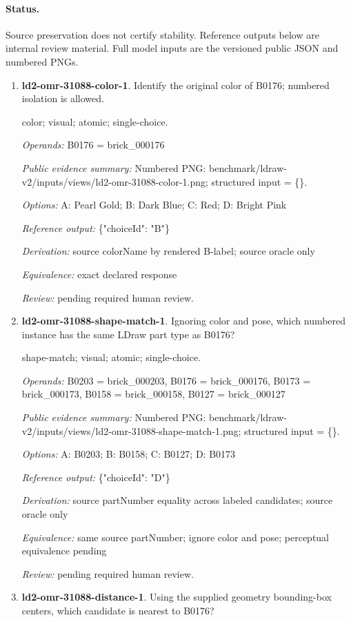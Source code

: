 \paragraph{Status.}Source preservation does not certify stability. Reference outputs below are internal review material. Full model inputs are the versioned public JSON and numbered PNGs.
\begin{enumerate}
\item \textbf{ld2-omr-31088-color-1}. Identify the original color of B0176; numbered isolation is allowed.
\par{\small color; visual; atomic; single-choice.\par\textit{Operands:} B0176 = brick\_000176\par\textit{Public evidence summary:} Numbered PNG: benchmark/ldraw-v2/inputs/views/ld2-omr-31088-color-1.png; structured input = \{\}.\par\textit{Options:} A: Pearl Gold; B: Dark Blue; C: Red; D: Bright Pink\par\textit{Reference output:} \{"choiceId": "B"\}\par\textit{Derivation:} source colorName by rendered B-label; source oracle only\par\textit{Equivalence:} exact declared response\par\textit{Review:} pending required human review.}
\item \textbf{ld2-omr-31088-shape-match-1}. Ignoring color and pose, which numbered instance has the same LDraw part type as B0176?
\par{\small shape-match; visual; atomic; single-choice.\par\textit{Operands:} B0203 = brick\_000203, B0176 = brick\_000176, B0173 = brick\_000173, B0158 = brick\_000158, B0127 = brick\_000127\par\textit{Public evidence summary:} Numbered PNG: benchmark/ldraw-v2/inputs/views/ld2-omr-31088-shape-match-1.png; structured input = \{\}.\par\textit{Options:} A: B0203; B: B0158; C: B0127; D: B0173\par\textit{Reference output:} \{"choiceId": "D"\}\par\textit{Derivation:} source partNumber equality across labeled candidates; source oracle only\par\textit{Equivalence:} same source partNumber; ignore color and pose; perceptual equivalence pending\par\textit{Review:} pending required human review.}
\item \textbf{ld2-omr-31088-distance-1}. Using the supplied geometry bounding-box centers, which candidate is nearest to B0176?

\end{enumerate}
